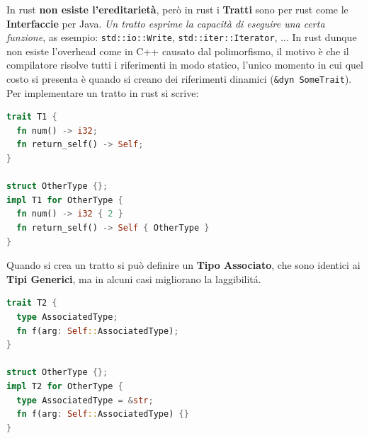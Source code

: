 \documentclass[12pt]{article}
\begin{document}
\hfill

In rust \textbf{non esiste l'ereditariet\`a}, per\`o in rust i \textbf{Tratti} sono per rust come le \textbf{Interfaccie} per Java. \emph{Un tratto esprime la capacit\`a di eseguire una certa funzione}, as esempio: \texttt{std::io::Write}, \texttt{std::iter::Iterator}, ... In rust dunque non esiste l'overhead come in C++ causato dal polimorfismo, il motivo \`e che il compilatore risolve tutti i riferimenti in modo statico, l'unico momento in cui quel costo si presenta \`e quando si creano dei riferimenti dinamici (\texttt{\&dyn SomeTrait}). Per implementare un tratto in rust si scrive:
\begin{lstlisting}[language=rust]
trait T1 {
  fn num() -> i32;
  fn return_self() -> Self;
}

struct OtherType {};
impl T1 for OtherType {
  fn num() -> i32 { 2 }
  fn return_self() -> Self { OtherType }
}
\end{lstlisting}
Quando si crea un tratto si pu\`o definire un \textbf{Tipo Associato}, che sono identici ai \textbf{Tipi Generici}, ma in alcuni casi migliorano la laggibilit\'a.
\begin{lstlisting}[language=rust]
trait T2 {
  type AssociatedType;
  fn f(arg: Self::AssociatedType);
}

struct OtherType {};
impl T2 for OtherType {
  type AssociatedType = &str;
  fn f(arg: Self::AssociatedType) {}
}
\end{lstlisting}
\end{document}
